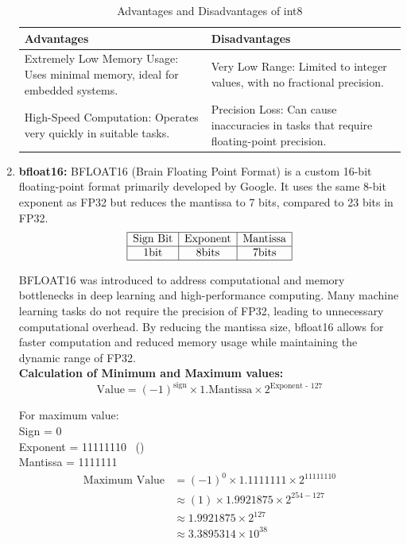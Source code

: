 \documentclass{ioereport}
\begin{document}
\begin{enumerate}[label=\textbf{\roman*.}]
 
    \begin{table}[H]
        \centering
        \caption{Advantages and Disadvantages of int8}
        \label{tab:int8}
        \begin{tabular}{|p{6cm}|p{6cm}|}
        \hline
        \textbf{Advantages} & \textbf{Disadvantages} \\
        \hline
        Extremely Low Memory Usage: Uses minimal memory, ideal for embedded systems. & Very Low Range: Limited to integer values, with no fractional precision. \\
        \hline
        High-Speed Computation: Operates very quickly in suitable tasks. & Precision Loss: Can cause inaccuracies in tasks that require floating-point precision. \\
        \hline
        \end{tabular}
    \end{table}

    \item \textbf{bfloat16:}
    BFLOAT16 (Brain Floating Point Format) is a custom 16-bit floating-point format primarily developed by Google. It uses the same 8-bit exponent as FP32 but reduces the mantissa to 7 bits, compared to 23 bits in FP32.
    \[
    \begin{array}{|c|c|c|}
        \hline
        \text{Sign Bit} & \text{Exponent} & \text{Mantissa} \\
        \hline
        1 \text{bit} & 8 \text{bits} & 7 \text{bits} \\
        \hline
    \end{array}
    \]
    
    BFLOAT16 was introduced to address computational and memory bottlenecks in deep learning and high-performance computing. Many machine learning tasks do not require the precision of FP32, leading to unnecessary computational overhead. By reducing the mantissa size, bfloat16 allows for faster computation and reduced memory usage while maintaining the dynamic range of FP32. \\
    \textbf{Calculation of Minimum and Maximum values:} 
    \[
    \text{Value} = (-1)^{\text{sign}} \times 1.\text{Mantissa} \times 2^{\text{Exponent - 127}}
    \]

    For maximum value:\\
    Sign = 0 \\
    Exponent = 11111110 \ () \\
    Mantissa = 1111111
    \[
        \begin{aligned}
            \text{Maximum Value} &= (-1)^{0} \times 1.1111111 \times 2^{11111110} \\
            & \approx (1) \times 1.9921875 \times 2^{254 - 127} \\
            & \approx 1.9921875 \times 2^{127} \\
            & \approx 3.3895314 \times 10^{38}
        \end{aligned}
    \]


\end{enumerate}
\end{document}
